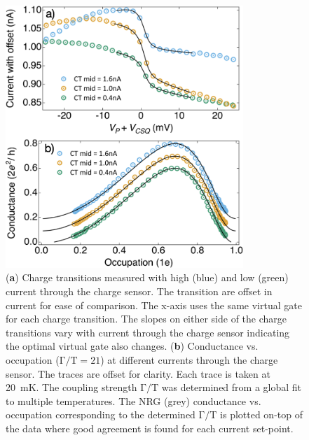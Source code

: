 \begin{figure}[ht]
  \begin{center}
    \includegraphics[width=0.8\textwidth]{figures/ch3/crop_PosterFiguresMaster.013.png}
    \caption[Conductance vs. Occupation : Varying the current through the charge sensor]{\label{fig:ch3/cond_occ_QPC_vs_ct} 
    (\textbf{a}) Charge transitions measured with high (blue) and low (green) current through the charge sensor. The transition are offset in current for ease of comparison. The x-axis uses the same virtual gate for each charge transition. The slopes on either side of the charge transitions vary with current through the charge sensor indicating the optimal virtual gate also changes. (\textbf{b}) Conductance vs. occupation ($\mathrm{\Gamma/T=21}$) at different currents through the charge sensor. The traces are offset for clarity. Each trace is taken at \qty{20}{mK}. The coupling strength $\mathrm{\Gamma/T}$ was determined from a global fit to multiple temperatures. The NRG (grey) conductance vs. occupation corresponding to the determined $\mathrm{\Gamma/T}$ is plotted on-top of the data where good agreement is found for each current set-point.}
  \end{center}
\end{figure}




